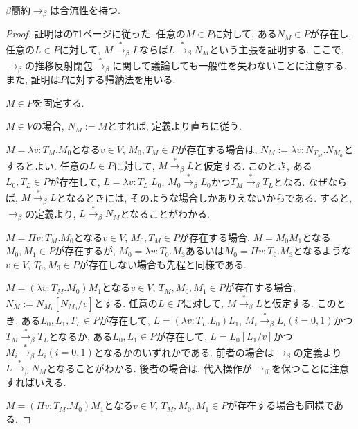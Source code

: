 \documentclass{ltjsarticle}
\begin{document}
\begin{thm}
 $\beta$簡約$\rightarrow_{\beta}$は合流性を持つ.
\end{thm}
\begin{proof}
 証明は\cite{高橋正子1991計算論}の71ページに従った.
任意の$M \in P$に対して, ある$N_M \in P$が存在し, 任意の$L \in P$に対して, 
$M \overset{*}{\rightarrow}_\beta L$ならば$L \overset{*}{\rightarrow}_\beta N_M$という主張を証明する.
ここで, $\rightarrow_\beta$の推移反射閉包$\overset{*}{\rightarrow}_\beta$に関して議論しても一般性を失わないことに注意する.
また, 証明は$P$に対する帰納法を用いる.

$M \in P$を固定する.

$M \in V$の場合, $N_M := M$とすれば, 定義より直ちに従う.
 
$M = \lambda v \colon T_M . M_0$となる$v \in V$, $M_0, T_M \in P$が存在する場合は, $N_M := \lambda v \colon N_{T_M} . N_{M_0}$とするとよい.
任意の$L \in P$に対して, $M \overset{*}{\rightarrow}_\beta L$と仮定する.
このとき, ある$L_0, T_L \in P$が存在して, $L = \lambda v \colon T_L . L_0$, $M_0 \overset{*}{\rightarrow}_\beta L_0$かつ$T_M \overset{*}{\rightarrow}_\beta T_L$となる.
なぜならば, $M \overset{*}{\rightarrow}_\beta L$となるときには, そのような場合しかありえないからである.
すると, $\rightarrow_{\beta}$の定義より, $L \overset{*}{\rightarrow}_\beta N_M$となることがわかる.
 
$M = \Pi v \colon T_M . M_0$となる$v \in V$, $M_0, T_M \in P$が存在する場合, 
$M = M_0 M_1$となる$M_0, M_1 \in P$が存在するが, $M_0 = \lambda v \colon T_0 . M_3$あるいは$M_0 = \Pi v \colon T_0 . M_3$となるような$v \in V$, $T_0, M_3 \in P$が存在しない場合も先程と同様である.

$M = (\lambda v : T_M . M_0) M_1$となる$v \in V$, $T_M, M_0, M_1 \in P$が存在する場合, $N_M := N_{M_1}[N_{M_0}/v]$とする.
任意の$L \in P$に対して, $M \overset{*}{\rightarrow}_\beta L$と仮定する.
このとき, ある$L_0, L_1, T_L \in P$が存在して, $L = (\lambda v \colon T_L . L_0) L_1$, $M_i \overset{*}{\rightarrow}_\beta L_i (i = 0, 1)$かつ$T_M \overset{*}{\rightarrow}_\beta T_L$となるか,
ある$L_0, L_1 \in P$が存在して, $L = L_0[L_1/v]$かつ$M_i \overset{*}{\rightarrow}_\beta L_i (i = 0, 1)$となるかのいずれかである.
前者の場合は$\rightarrow_{\beta}$の定義より$L \overset{*}{\rightarrow}_\beta N_M$となることがわかる.
後者の場合は, 代入操作が$\rightarrow_{\beta}$を保つことに注意すればいえる.
 
$M = (\Pi v : T_M . M_0) M_1$となる$v \in V$, $T_M, M_0, M_1 \in P$が存在する場合も同様である.
\end{proof}
\end{document}
